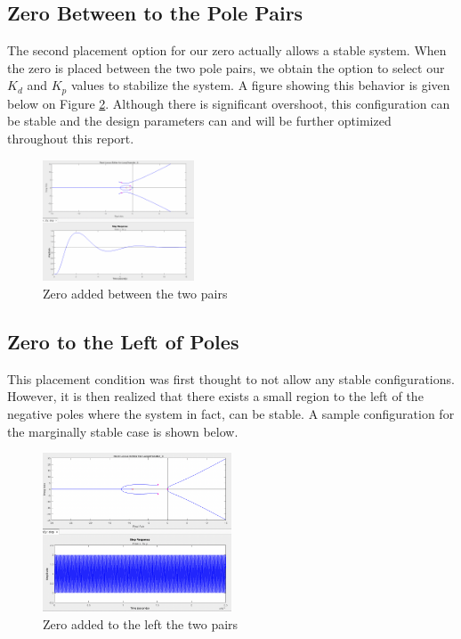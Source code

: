 \subsection{Zero Between to the Pole Pairs}
The second placement option for our zero actually allows a stable system. When the zero is placed between the two pole pairs, we obtain the option to select our $K_d$ and $K_p$ values to stabilize the system. A figure showing this behavior is given below on Figure \ref{fig:zerobetween}. Although there is significant overshoot, this configuration can be stable and the design parameters can and will be further optimized throughout this report.

\begin{figure}[H]
    \centering
    \includegraphics[width=0.4\textwidth]{images/zero_between.png}
    \caption{Zero added between the two pairs}
    \label{fig:zerobetween}
\end{figure}


\subsection{Zero to the Left of Poles}

This placement condition was first thought to not allow any stable configurations. However, it is then realized that there exists a small region to the left of the negative poles where the system in fact, can be stable. A sample configuration for the marginally stable case is shown below.

\begin{figure}[H]
    \centering
    \includegraphics[width=0.5\textwidth]{images/zero_right.png}
    \caption{Zero added to the left the two pairs}
    \label{fig:zerobetween}
\end{figure}
